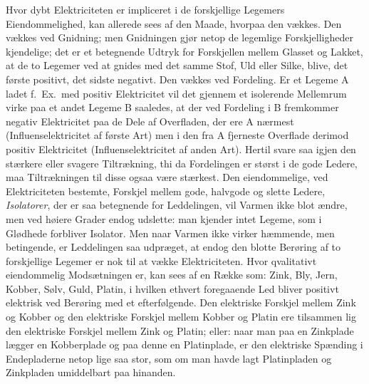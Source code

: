 \documentclass[12pt,a4paper]{book}
\begin{document}
Hvor dybt Elektriciteten er impliceret i de forskjellige
Legemers Eiendommelighed, kan allerede sees af den Maade, hvorpaa den
vækkes. Den vækkes ved Gnidning; men Gnidningen gjør netop de
legemlige Forskjelligheder kjendelige; det er et betegnende Udtryk for
Forskjellen mellem Glasset og Lakket, at de to Legemer ved at gnides
med det samme Stof, Uld eller Silke, blive, det første positivt, det
sidste negativt. Den vækkes ved Fordeling. Er et Legeme A ladet
f.\ Ex.\ med positiv Elektricitet vil det gjennem et isolerende
Mellemrum virke paa et andet Legeme B saaledes, at der ved Fordeling i
B fremkommer negativ Elektricitet paa de Dele af Overfladen, der ere A
nærmest (Influenselektricitet af første Art) men i den fra A fjerneste
Overflade derimod positiv Elektricitet (Influenselektricitet af anden
Art). Hertil svare saa igjen den stærkere eller svagere Tiltrækning,
thi da Fordelingen er størst i de gode Ledere, maa Tiltrækningen til
disse ogsaa være stærkest. Den eiendommelige, ved Elektriciteten
bestemte, Forskjel mellem gode, halvgode og slette Ledere,
\emph{Isolatorer}, der er saa betegnende for Leddelingen, vil Varmen
ikke blot ændre, men ved høiere Grader endog udslette: man kjender
intet Legeme, som i Glødhede forbliver Isolator. Men naar Varmen ikke
virker hæmmende, men betingende, er Leddelingen saa udpræget, at endog
den blotte Berøring af to forskjellige Legemer er nok til at vække
Elektriciteten. Hvor qvalitativt eiendommelig Modsætningen er, kan
sees af en Række som: Zink, Bly, Jern, Kobber, Sølv, Guld, Platin, i
hvilken ethvert foregaaende Led bliver positivt elektrisk ved Berøring
med et efterfølgende. Den elektriske Forskjel mellem Zink og Kobber og
den elektriske Forskjel mellem Kobber og Platin ere tilsammen lig den
elektriske Forskjel mellem Zink og Platin; eller: naar man paa en
Zinkplade lægger en Kobberplade og paa denne en Platinplade, er den
elektriske Spænding i Endepladerne netop lige saa stor, som om man
havde lagt Platinpladen og Zinkpladen umiddelbart paa hinanden.
\end{document}
